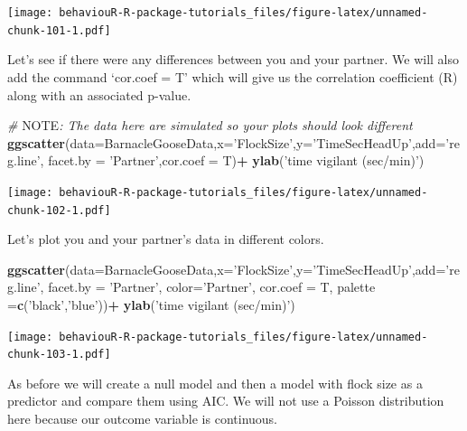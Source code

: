 \documentclass[]{book}
\newenvironment{Shaded}{\begin{snugshade}}{\end{snugshade}}
\newcommand{\AlertTok}[1]{\textcolor[rgb]{0.94,0.16,0.16}{#1}}
\newcommand{\CommentTok}[1]{\textcolor[rgb]{0.56,0.35,0.01}{\textit{#1}}}
\newcommand{\DataTypeTok}[1]{\textcolor[rgb]{0.13,0.29,0.53}{#1}}
\newcommand{\KeywordTok}[1]{\textcolor[rgb]{0.13,0.29,0.53}{\textbf{#1}}}
\newcommand{\NormalTok}[1]{#1}
\newcommand{\OperatorTok}[1]{\textcolor[rgb]{0.81,0.36,0.00}{\textbf{#1}}}
\newcommand{\StringTok}[1]{\textcolor[rgb]{0.31,0.60,0.02}{#1}}
\begin{document}
\texttt{[image: behaviouR-R-package-tutorials\_files/figure-latex/unnamed-chunk-101-1.pdf]}

Let's see if there were any differences between you and your partner. We will also add the command `cor.coef = T' which will give us the correlation coefficient (R) along with an associated p-value.

\begin{Shaded}
\begin{Highlighting}[]
\CommentTok{# }\AlertTok{NOTE}\CommentTok{: The data here are simulated so your plots should look different}
\KeywordTok{ggscatter}\NormalTok{(}\DataTypeTok{data=}\NormalTok{BarnacleGooseData,}\DataTypeTok{x=}\StringTok{'FlockSize'}\NormalTok{,}\DataTypeTok{y=}\StringTok{'TimeSecHeadUp'}\NormalTok{,}\DataTypeTok{add=}\StringTok{'reg.line'}\NormalTok{,}
          \DataTypeTok{facet.by =} \StringTok{'Partner'}\NormalTok{,}\DataTypeTok{cor.coef =}\NormalTok{ T)}\OperatorTok{+}
\StringTok{  }\KeywordTok{ylab}\NormalTok{(}\StringTok{'time vigilant (sec/min)'}\NormalTok{)}
\end{Highlighting}
\end{Shaded}

\texttt{[image: behaviouR-R-package-tutorials\_files/figure-latex/unnamed-chunk-102-1.pdf]}

Let's plot you and your partner's data in different colors.

\begin{Shaded}
\begin{Highlighting}[]
\KeywordTok{ggscatter}\NormalTok{(}\DataTypeTok{data=}\NormalTok{BarnacleGooseData,}\DataTypeTok{x=}\StringTok{'FlockSize'}\NormalTok{,}\DataTypeTok{y=}\StringTok{'TimeSecHeadUp'}\NormalTok{,}\DataTypeTok{add=}\StringTok{'reg.line'}\NormalTok{,}
          \DataTypeTok{facet.by =} \StringTok{'Partner'}\NormalTok{, }\DataTypeTok{color=}\StringTok{'Partner'}\NormalTok{, }\DataTypeTok{cor.coef =}\NormalTok{ T,}
          \DataTypeTok{palette =}\KeywordTok{c}\NormalTok{(}\StringTok{'black'}\NormalTok{,}\StringTok{'blue'}\NormalTok{))}\OperatorTok{+}
\StringTok{            }\KeywordTok{ylab}\NormalTok{(}\StringTok{'time vigilant (sec/min)'}\NormalTok{)}
\end{Highlighting}
\end{Shaded}

\texttt{[image: behaviouR-R-package-tutorials\_files/figure-latex/unnamed-chunk-103-1.pdf]}

As before we will create a null model and then a model with flock size as a predictor and compare them using AIC. We will not use a Poisson distribution here because our outcome variable is continuous.
\end{document}
